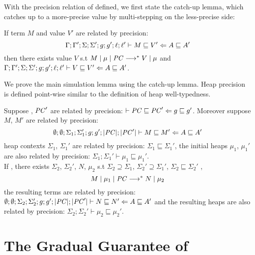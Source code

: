 With the precision relation of \CC defined, we first state the catch-up lemma,
which catches up to a more-precise value by multi-stepping on the less-precise
side:

\begin{lemma}
\label{lem:catchup}
If term $M$ and value $V'$ are related by precision:
$${\Gamma};{\Gamma'};{\Sigma};{\Sigma'};{g};{g'};{\ell};{\ell'}\vdash{M}\sqsubseteq{V'}\Leftarrow{A}\sqsubseteq{A'}$$
then there exists value $V$ s.t $M\mid\mu\mid\mathit{PC} \longrightarrow^{*} V\mid\mu$ and
${\Gamma};{\Gamma'};{\Sigma};{\Sigma'};{g};{g'};{\ell};{\ell'}\vdash{V}\sqsubseteq{V'}\Leftarrow{A}\sqsubseteq{A'}$.
\end{lemma}

We prove the main simulation lemma using the catch-up lemma. Heap precision is
defined point-wise similar to the definition of heap well-typedness.

\begin{lemma}
\label{lem:sim}
Suppose \PC, $\mathit{PC}'$ are related by precision: $\ccprec{\PC}{\PC'}{g}{g'}$.
Moreover suppose $M$, $M'$ are related by precision:
$${\emptyset};{\emptyset};{\Sigma_1};{\Sigma_1'};{g};{g'};{|\mathit{PC}|};{|\mathit{PC}'|}\vdash{M}\sqsubseteq{M'}\Leftarrow{A}\sqsubseteq{A'}$$
heap contexts $\Sigma_1$, $\Sigma_1'$ are related by precision:
$\Sigma_1 \sqsubseteq \Sigma_1'$, the initial heaps $\mu_1$, $\mu_1'$
are also related by precision: $\Sigma_1 ; \Sigma_1' \vdash \mu_1 \sqsubseteq \mu_1'$. \\
If , there exists $\Sigma_2$,
$\Sigma_2'$, $N$, $\mu_2$ s.t $\Sigma_2 \supseteq \Sigma_1$,
$\Sigma_2' \supseteq \Sigma_1'$, $\Sigma_2 \sqsubseteq \Sigma_2'$ ,
$$M\mid\mu_1\mid\mathit{PC} \longrightarrow^{*} N\mid\mu_2$$
the resulting terms are related by precision:
${\emptyset};{\emptyset};{\Sigma_2};{\Sigma_2'};{g};{g'};{|\mathit{PC}|};{|\mathit{PC}'|}\vdash{N}\sqsubseteq{N'}\Leftarrow{A}\sqsubseteq{A'}$
and the resulting heaps are also related by precision: $\Sigma_2 ; \Sigma_2' \vdash \mu_2 \sqsubseteq \mu_2'$.
\end{lemma}


\section{The Gradual Guarantee of \Surface}
\label{sec:gg}

